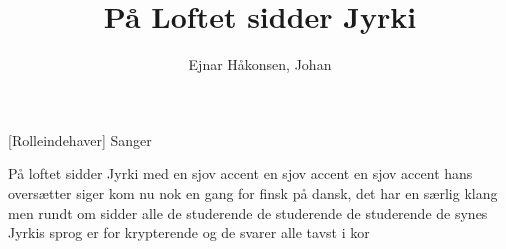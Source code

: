 \documentclass[a4paper,11pt]{article}
\title{På Loftet sidder Jyrki}
\author{Ejnar Håkonsen, Johan}
\begin{document}
\maketitle

\begin{roles}  
[Rolleindehaver] Sanger
\end{roles}

\begin{song}
   På loftet sidder Jyrki med en sjov accent
en sjov accent
en sjov accent
hans oversætter siger kom nu nok en gang
for finsk på dansk, det har en særlig klang
men rundt om sidder alle de studerende
de studerende
de studerende
de synes Jyrkis sprog er for krypterende
og de svarer alle tavst i kor
\end{song}
\end{document}
